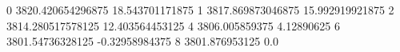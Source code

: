 0 3820.420654296875 18.543701171875
1 3817.869873046875 15.992919921875
2 3814.280517578125 12.403564453125
4 3806.005859375 4.12890625
6 3801.54736328125 -0.32958984375
8 3801.876953125 0.0
